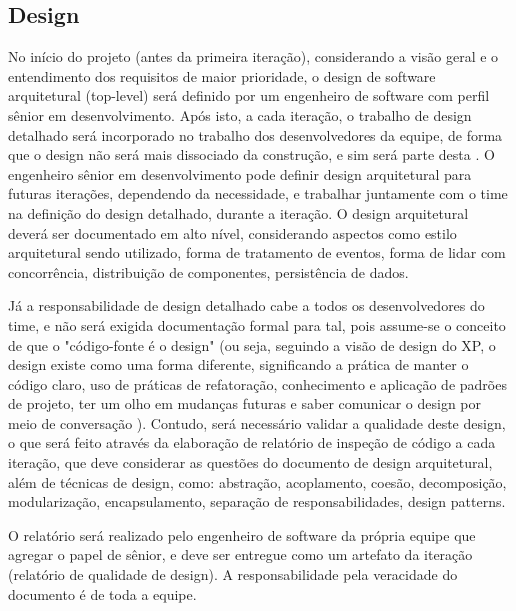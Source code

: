 \documentclass[12pt,journal,compsoc]{IEEEtran}
\begin{document}
\subsection{Design}

No início do projeto (antes da primeira iteração), considerando a visão geral e o entendimento dos requisitos de maior prioridade, o design de software arquitetural (top-level) será definido por um engenheiro de software com perfil sênior em desenvolvimento. Após isto, a cada iteração, o trabalho de design detalhado será incorporado no trabalho dos desenvolvedores da equipe, de forma que o design não será mais dissociado da construção, e sim será parte desta \cite{fowler_planned_evolutionary_design}. O engenheiro sênior em desenvolvimento pode definir design arquitetural para futuras iterações, dependendo da necessidade, e trabalhar juntamente com o time na definição do design detalhado, durante a iteração. O design arquitetural deverá ser documentado em alto nível, considerando aspectos como estilo arquitetural sendo utilizado, forma de tratamento de eventos, forma de lidar com concorrência, distribuição de componentes, persistência de dados.

Já a responsabilidade de design detalhado cabe a todos os desenvolvedores do time, e não será exigida documentação formal para tal, pois assume-se o conceito de que o "código-fonte é o design" (ou seja, seguindo a visão de design do XP, o design existe como uma forma diferente, significando a prática de manter o código claro, uso de práticas de refatoração, conhecimento e aplicação de padrões de projeto, ter um olho em mudanças futuras e saber comunicar o design por meio de conversação \cite{fowler_design_dead}). Contudo, será necessário validar a qualidade deste design, o que será feito através da elaboração de relatório de inspeção de código a cada iteração, que deve considerar as questões do documento de design arquitetural, além de técnicas de design, como: abstração, acoplamento, coesão, decomposição, modularização, encapsulamento, separação de responsabilidades, design patterns. 

O relatório será realizado pelo engenheiro de software da própria equipe que agregar o papel de sênior, e deve ser entregue como um artefato da iteração (relatório de qualidade de design). A responsabilidade pela veracidade do documento é de toda a equipe.
\end{document}
